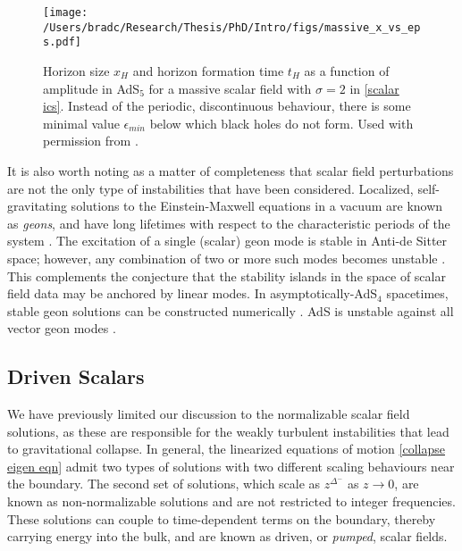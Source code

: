 \documentclass[../PhD.tex]{subfiles}
\begin{document}
\begin{figure}[h]
	\centering
	\texttt{[image: /Users/bradc/Research/Thesis/PhD/Intro/figs/massive\_x\_vs\_eps.pdf]}
	\caption[Horizon size and horizon formation time for a massive scalar]{Horizon size $x_H$ and horizon formation time $t_H$ as a function of amplitude in AdS$_5$ for a massive scalar field with $\sigma = 2$ in {\rm\eqref{scalar ics}}. Instead of the periodic, discontinuous behaviour, there is some minimal value $\epsilon_{min}$ below which black holes do not form. Used with permission from {\rm\cite{1508.02709}}.}
	\label{fig: massive x vs eps}
\end{figure}

It is also worth noting as a matter of completeness that scalar field perturbations are not the only type of instabilities that have been considered. Localized, self-gravitating solutions to the Einstein-Maxwell equations in a vacuum are known as \emph{geons}, and have long lifetimes with respect to the characteristic periods of the system \cite{Wheeler:1955zz}. The excitation of a single (scalar) geon mode is stable in Anti-de Sitter space; however, any combination of two or more such modes becomes unstable \cite{1109.1825}. This complements the conjecture that the stability islands in the space of scalar field data may be anchored by linear modes. In asymptotically-AdS$_4$ spacetimes, stable geon solutions can be constructed numerically \cite{1701.09100, 1701.07804}. AdS is unstable against all vector geon modes \cite{1408.5906}.


\subsection{Driven Scalars}

We have previously limited our discussion to the normalizable scalar field solutions, as these are responsible for the weakly turbulent instabilities that lead to gravitational collapse. In general, the linearized equations of motion \eqref{collapse eigen eqn} admit two types of solutions with two different scaling behaviours near the boundary. The second set of solutions, which scale as $z^{\Delta^-}$ as $z \to 0$, are known as non-normalizable solutions and are not restricted to integer frequencies. These solutions can couple to time-dependent terms on the boundary, thereby carrying energy into the bulk, and are known as driven, or \emph{pumped}, scalar fields.
\end{document}
